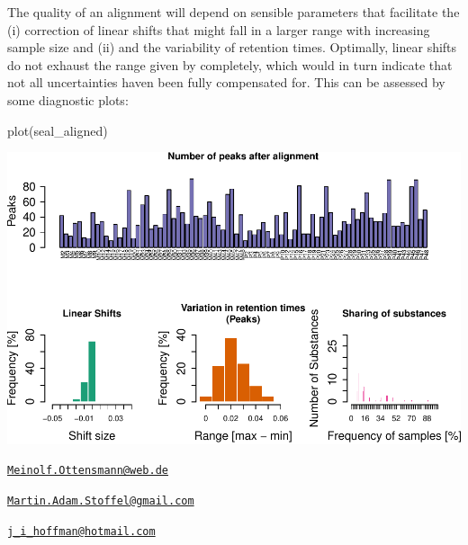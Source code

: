 The quality of an alignment will depend on sensible parameters that
facilitate the (i) correction of linear shifts that might fall in a
larger range with increasing sample size and (ii) and the variability of
retention times. Optimally, linear shifts do not exhaust the range given
by  completely, which would in turn
indicate that not all uncertainties haven been fully compensated for.
This can be assessed by some diagnostic plots:

\begin{Schunk}
\begin{Sinput}
plot(seal_aligned)
\end{Sinput}

\includegraphics{ottensmann-stoffel-hoffman_files/figure-latex/unnamed-chunk-6-1} \end{Schunk}



\address{%
Meinolf Ottensmann\\
Department of Animal Behaviour\\
Bielefeld University\\ Morgenbreede 45\\ 33615 Bielefeld\\
}
\href{mailto:Meinolf.Ottensmann@web.de}{\nolinkurl{Meinolf.Ottensmann@web.de}}

\address{%
Martin A. Stoffel\\
Department of Animal Behaviour\\
Bielefeld University\\ Morgenbreede 45\\ 33615 Bielefeld\\
}
\href{mailto:Martin.Adam.Stoffel@gmail.com}{\nolinkurl{Martin.Adam.Stoffel@gmail.com}}

\address{%
Joseph I. Hoffman\\
Department of Animal Behaviour\\
Bielefeld University\\ Morgenbreede 45\\ 33615 Bielefeld\\
}
\href{mailto:j_i_hoffman@hotmail.com}{\nolinkurl{j\_i\_hoffman@hotmail.com}}

